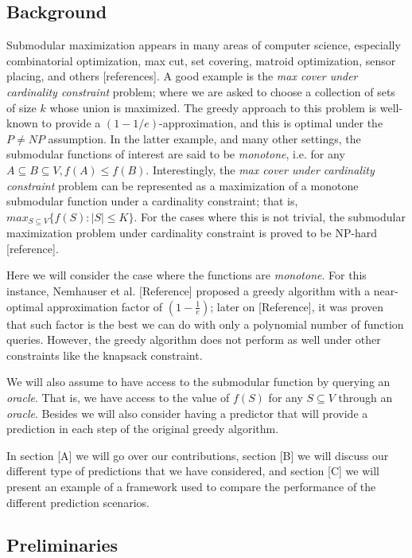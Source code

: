 \documentclass{article}
\begin{document}
\subsection{Background}
Submodular maximization appears in many areas of computer science, especially combinatorial optimization, max cut, set covering, matroid optimization, sensor placing, and others [references]. A good example is the \emph{max cover under cardinality constraint} problem; where we are asked to choose a collection of sets of size $k$ whose union is maximized. The greedy approach to this problem is well-known to provide a $(1-1/e)$-approximation, and this is optimal under the $P \neq NP$ assumption. In the latter example, and many other settings, the submodular functions of interest are said to be \emph{monotone}, i.e. for any $A\subseteq B \subseteq V, f(A) \leq f(B)$. Interestingly, the \emph{max cover under cardinality constraint} problem can be represented as a maximization of a monotone submodular function under a cardinality constraint; that is, $max_{S \subseteq V} \{f(S) : |S| \leq K\}$. For the cases where this is not trivial, the submodular maximization problem under cardinality constraint is proved to be NP-hard [reference]. 


Here we will consider the case where the functions are \emph{monotone}. For this instance, Nemhauser et al. [Reference] proposed a greedy algorithm with a near-optimal approximation factor of $(1 -\frac{1}{e})$; later on [Reference], it was proven that such factor is the best we can do with only a polynomial number of function queries. However, the greedy algorithm does not perform as well under other constraints like the knapsack constraint.

We will also assume to have access to the submodular function by querying an \emph{oracle}. That is, we have access to the value of $f(S)$ for any $S \subseteq V$ through an \emph{oracle}. Besides we will also consider having a predictor that will provide a prediction in each step of the original greedy algorithm.

In section [A] we will go over our contributions, section [B] we will discuss our different type of predictions that we have considered, and section [C] we will present an example of a framework used to compare the performance of the different prediction scenarios. 

\subsection{Preliminaries}
\end{document}
